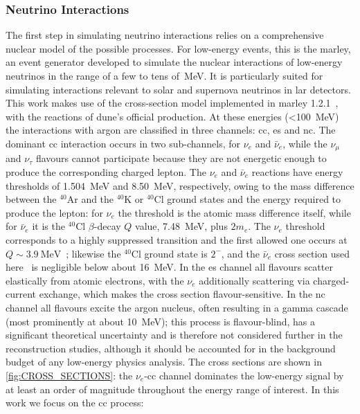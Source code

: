 \subsubsection{Neutrino Interactions\label{sec:NEUTRINO_INTERACTIONS}}
The first step in simulating neutrino interactions relies on a comprehensive nuclear model of the possible processes. For low-energy events, this is the \gls{marley}, an event generator developed to simulate the nuclear interactions of low-energy neutrinos in the range of a few to tens of~\unit{\mega\electronvolt}. It is particularly suited for simulating interactions relevant to solar and supernova neutrinos in \gls{lar} detectors. This work makes use of the cross-section model implemented in \gls{marley} 1.2.1~\cite{marley-base}, with the reactions of \gls{dune}'s official production. At these energies (\SI{<100}{\mega\electronvolt}) the interactions with argon are classified in three channels: \gls{cc}, \gls{es} and \gls{nc}. The dominant \gls{cc} interaction occurs in two sub-channels, for $\nu_e$ and $\bar{\nu}_e$, while the $\nu_\mu$ and $\nu_\tau$ flavours cannot participate because they are not energetic enough to produce the corresponding charged lepton. The $\nu_e$ and $\bar{\nu}_e$ reactions have energy thresholds of \SI{1.504}{\mega\electronvolt} and \SI{8.50}{\mega\electronvolt}, respectively, owing to the mass difference between the ${}^{40}$Ar and the ${}^{40}$K or ${}^{40}$Cl ground states and the energy required to produce the lepton: for $\nu_e$ the threshold is the atomic mass difference itself, while for $\bar{\nu}_e$ it is the ${}^{40}$Cl $\beta$-decay $Q$ value, \SI{7.48}{\mega\electronvolt}, plus $2m_e$. The $\nu_e$ threshold corresponds to a highly suppressed transition and the first allowed one occurs at $Q\sim\SI{3.9}{\mega\electronvolt}$~\cite{nuclide-chart-a40}; likewise the ${}^{40}$Cl ground state is $2^-$, and the $\bar{\nu}_e$ cross section used here~\cite{VanDessel:2019atx} is negligible below about \SI{16}{\mega\electronvolt}. In the \gls{es} channel all flavours scatter elastically from atomic electrons, with the $\nu_e$ additionally scattering via charged-current exchange, which makes the cross section flavour-sensitive. In the \gls{nc} channel all flavours excite the argon nucleus, often resulting in a gamma cascade (most prominently at about \SI{10}{\mega\electronvolt}); this process is flavour-blind, has a significant theoretical uncertainty and is therefore not considered further in the reconstruction studies, although it should be accounted for in the background budget of any low-energy physics analysis. The cross sections are shown in \cref{fig:CROSS_SECTIONS}: the $\nu_e$-\gls{cc} channel dominates the low-energy signal by at least an order of magnitude throughout the energy range of interest. In this work we focus on the \gls{cc} process:


